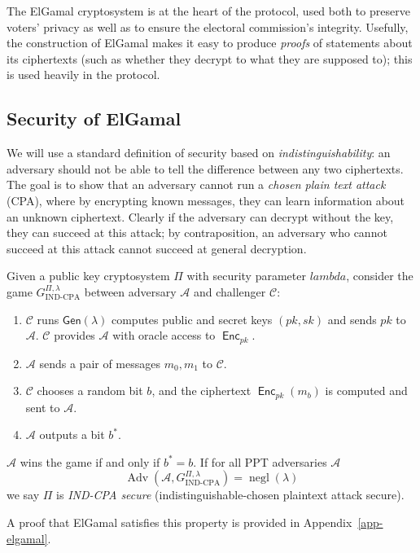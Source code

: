 \documentclass[12pt,a4paper]{article}
\DeclareMathOperator{\negl}{\text{negl}}
\DeclareMathOperator{\Adv}{\text{Adv}}
\DeclareMathOperator{\Enc}{\mathsf{Enc}}
\theoremstyle{definition}
\begin{document}
The ElGamal cryptosystem is at the heart of the protocol, used both to preserve voters' privacy as well as to ensure the electoral commission's integrity. Usefully, the construction of ElGamal makes it easy to produce \textit{proofs} of statements about its ciphertexts (such as whether they decrypt to what they are supposed to); this is used heavily in the protocol.

\subsection{Security of ElGamal}
We will use a standard definition of security based on \textit{indistinguishability}: an adversary should not be able to tell the difference between any two ciphertexts. The goal is to show that an adversary cannot run a \textit{chosen plain text attack} (CPA), where by encrypting known messages, they can learn information about an unknown ciphertext. Clearly if the adversary can decrypt without the key, they can succeed at this attack; by contraposition, an adversary who cannot succeed at this attack cannot succeed at general decryption.

\begin{definition}
    Given a public key cryptosystem $\Pi$ with security parameter $lambda$, consider the game $G_{\text{IND-CPA}}^{\Pi,\lambda}$ between adversary $\mathcal{A}$ and challenger $\mathcal{C}$:
    \begin{enumerate}
        \item $\mathcal{C}$ runs $\mathsf{Gen}(\lambda)$ computes public and secret keys $(pk, sk)$ and sends $pk$ to $\mathcal{A}$. $\mathcal{C}$ provides $\mathcal{A}$ with oracle access to $\Enc_{pk}$.
        \item $\mathcal{A}$ sends a pair of messages $m_0, m_1$ to $\mathcal{C}$.
        \item $\mathcal{C}$ chooses a random bit $b$, and the ciphertext $\Enc_{pk}(m_b)$ is computed and sent to $\mathcal{A}$.
        \item $\mathcal{A}$ outputs a bit $b^*$.
    \end{enumerate}
    $\mathcal{A}$ wins  the game if and only if $b^*=b$. If for all PPT adversaries $\mathcal{A}$
    $$\Adv\left(\mathcal{A},G^{\Pi,\lambda}_{\text{IND-CPA}}\right)=\negl(\lambda)$$
    we say $\Pi$ is \textit{IND-CPA secure} (indistinguishable-chosen plaintext attack secure).
\end{definition}
A proof that ElGamal satisfies this property is provided in Appendix~\ref{app-elgamal}.
\end{document}
